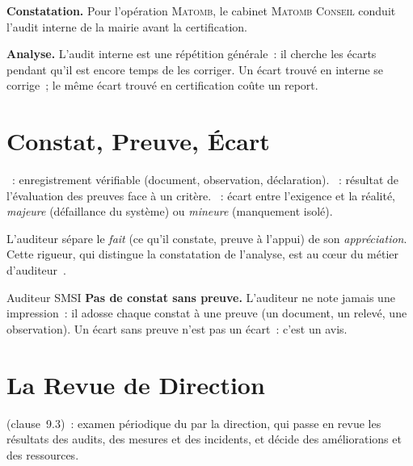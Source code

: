 \begin{boxprocedure}
\textbf{Constatation.} Pour l'opération \textsc{Matomb}, le cabinet
\textsc{Matomb Conseil} conduit l'audit interne de la mairie avant la
certification.

\medskip
\textbf{Analyse.} L'audit interne est une répétition générale~: il cherche les
écarts pendant qu'il est encore temps de les corriger. Un écart trouvé en
interne se corrige~; le même écart trouvé en certification coûte un report.
\end{boxprocedure}

\section{Constat, Preuve, Écart}
\label{sec:c19-constat}

\begin{boxdef}
~: enregistrement vérifiable (document, observation,
déclaration). ~: résultat de l'évaluation des preuves face à
un critère. ~: écart entre l'exigence et la réalité,
\emph{majeure} (défaillance du système) ou \emph{mineure} (manquement isolé).
\end{boxdef}

L'auditeur sépare le \emph{fait} (ce qu'il constate, preuve à l'appui) de son
\emph{appréciation}. Cette rigueur, qui distingue la constatation de l'analyse,
est au cœur du métier d'auditeur~\cite{minka2026auditologie}.

\begin{boxmetier}{Auditeur SMSI}
\textbf{Pas de constat sans preuve.} L'auditeur ne note jamais une impression~:
il adosse chaque constat à une preuve (un document, un relevé, une observation).
Un écart sans preuve n'est pas un écart~: c'est un avis.
\end{boxmetier}

\section{La Revue de Direction}
\label{sec:c19-revue}

\begin{boxdef}
 (clause~9.3)~: examen périodique du 
par la direction, qui passe en revue les résultats des audits, des mesures et
des incidents, et décide des améliorations et des ressources.
\end{boxdef}

